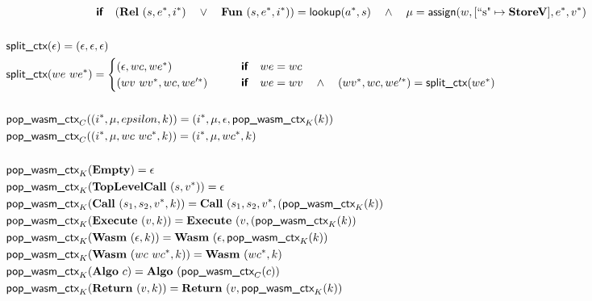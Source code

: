 \begin{align*}
  &\qquad\qquad\qquad\qquad\premise{if}\quad
  (\rel ~ (s, \seq e, \seq i) \quad\lor\quad \fun ~ (s, \seq e, \seq i)) = \lookup(\seq a, s)
  \quad\land\quad
  \mu = \assign(w, [\text{``s"} \mapsto \storev], \seq e, \seq v) \\
%
\newline \\
  &\splitctx(\epsilon) = (\epsilon, \epsilon, \epsilon) \\
  &\splitctx(we ~ \seq{we}) =
    \begin{cases}
      (\epsilon, wc, \seq{we})
      &\quad\quad \premise{if}\quad
      we = wc \\
      (wv ~ \seq{wv}, wc, \seq{we'})
      &\quad\quad \premise{if}\quad
      we = wv \quad\land\quad
      (\seq{wv}, wc, \seq{we'}) = \splitctx(\seq{we}) \\
    \end{cases}
  \\
%
\newline \\
  &\popwasmctx_{C}((\seq i, \mu, epsilon, k)) = (\seq i, \mu, \epsilon, \popwasmctx_K(k)) \\
  &\popwasmctx_{C}((\seq i, \mu, wc ~ \seq{wc}, k)) = (\seq i, \mu, wc^*, k) \\
%
\newline \\
  &\popwasmctx_{K}(\mt) = \epsilon \\
  &\popwasmctx_{K}(\toplevelcall ~ (s, v^*)) = \epsilon \\
  &\popwasmctx_{K}(\call ~ (s_1, s_2, \seq v, k)) =
    \call ~ (s_1, s_2, \seq v, (\popwasmctx_K(k)) \\
  &\popwasmctx_{K}(\exe ~ (v, k)) = \exe ~ (v, (\popwasmctx_K(k)) \\
  &\popwasmctx_{K}(\wasm ~ (\epsilon, k)) = \wasm ~ (\epsilon, \popwasmctx_{K}(k)) \\
  &\popwasmctx_{K}(\wasm ~ (wc ~ \seq{wc}, k)) = \wasm ~ (\seq{wc}, k) \\
  &\popwasmctx_{K}(\algo ~ c) = \algo ~ (\popwasmctx_C(c)) \\
  &\popwasmctx_{K}(\ret ~ (v, k)) = \ret ~ (v, \popwasmctx_K(k)) \\
%
\newline \\

\end{align*}
